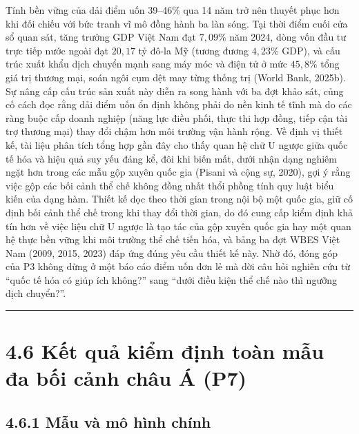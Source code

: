 \documentclass[
  a4paper,
  13pt]{extreport}
\begin{document}
Tính bền vững của dải điểm uốn 39--46\% qua 14 năm trở nên thuyết phục
hơn khi đối chiếu với bức tranh vĩ mô đồng hành ba làn sóng. Tại thời
điểm cuối cửa sổ quan sát, tăng trưởng GDP Việt Nam đạt \(7{,}09\%\) năm
2024, dòng vốn đầu tư trực tiếp nước ngoài đạt \(20{,}17\) tỷ đô-la Mỹ
(tương đương \(4{,}23\%\) GDP), và cấu trúc xuất khẩu dịch chuyển mạnh
sang máy móc và điện tử ở mức \(45{,}8\%\) tổng giá trị thương mại, soán
ngôi cụm dệt may từng thống trị (World Bank, 2025b). Sự nâng cấp cấu
trúc sản xuất này diễn ra song hành với ba đợt khảo sát, củng cố cách
đọc rằng dải điểm uốn ổn định không phải do nền kinh tế tĩnh mà do các
ràng buộc cấp doanh nghiệp (năng lực điều phối, thực thi hợp đồng, tiếp
cận tài trợ thương mại) thay đổi chậm hơn môi trường vận hành rộng. Về
định vị thiết kế, tài liệu phân tích tổng hợp gần đây cho thấy quan hệ
chữ U ngược giữa quốc tế hóa và hiệu quả suy yếu đáng kể, đôi khi biến
mất, dưới nhận dạng nghiêm ngặt hơn trong các mẫu gộp xuyên quốc gia
(Pisani và cộng sự, 2020), gợi ý rằng việc gộp các bối cảnh thể chế
không đồng nhất thổi phồng tính quy luật biểu kiến của dạng hàm. Thiết
kế dọc theo thời gian trong nội bộ một quốc gia, giữ cố định bối cảnh
thể chế trong khi thay đổi thời gian, do đó cung cấp kiểm định khả tín
hơn về việc liệu chữ U ngược là tạo tác của gộp xuyên quốc gia hay một
quan hệ thực bền vững khi môi trường thể chế tiến hóa, và bảng ba đợt
WBES Việt Nam (2009, 2015, 2023) đáp ứng đúng yêu cầu thiết kế này. Nhờ
đó, đóng góp của P3 không dừng ở một báo cáo điểm uốn đơn lẻ mà dời câu
hỏi nghiên cứu từ ``quốc tế hóa có giúp ích không?'' sang ``dưới điều
kiện thể chế nào thì ngưỡng dịch chuyển?''.

\begin{center}\rule{0.5\linewidth}{0.5pt}\end{center}

\hypertarget{kux1ebft-quux1ea3-kiux1ec3m-ux111ux1ecbnh-touxe0n-mux1eabu-ux111a-bux1ed1i-cux1ea3nh-chuxe2u-uxe1-p7}{%
\section{4.6 Kết quả kiểm định toàn mẫu đa bối cảnh châu Á
(P7)}\label{kux1ebft-quux1ea3-kiux1ec3m-ux111ux1ecbnh-touxe0n-mux1eabu-ux111a-bux1ed1i-cux1ea3nh-chuxe2u-uxe1-p7}}

\hypertarget{mux1eabu-vuxe0-muxf4-huxecnh-chuxednh}{%
\subsection{4.6.1 Mẫu và mô hình
chính}\label{mux1eabu-vuxe0-muxf4-huxecnh-chuxednh}}
\end{document}
